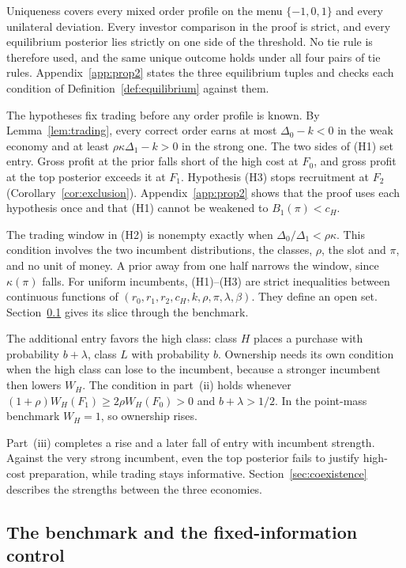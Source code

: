 Uniqueness covers every mixed order profile on the menu \(\{-1,0,1\}\) and every unilateral deviation. Every
investor comparison in the proof is strict, and every equilibrium posterior lies strictly on one side of the
threshold. No tie rule is therefore used, and the same unique outcome holds under all four pairs of tie rules.
Appendix~\ref{app:prop2} states the three equilibrium tuples and checks each condition of
Definition~\ref{def:equilibrium} against them.

The hypotheses fix trading before any order profile is known. By Lemma~\ref{lem:trading}, every correct order
earns at most \(\Delta_0-k<0\) in the weak economy and at least \(\rho\kappa\Delta_1-k>0\) in the strong one. The two
sides of (H1) set entry. Gross profit at the prior falls short of the high cost at \(F_0\), and gross profit at the
top posterior exceeds it at \(F_1\). Hypothesis (H3) stops recruitment at \(F_2\) (Corollary~\ref{cor:exclusion}).
Appendix~\ref{app:prop2} shows that the proof uses each hypothesis once and that (H1) cannot be weakened to
\(B_1(\pi)<c_H\).

The trading window in (H2) is nonempty exactly when \(\Delta_0/\Delta_1<\rho\kappa\). This condition involves the
two incumbent distributions, the classes, \(\rho\), the slot and \(\pi\), and no unit of money. A prior away from
one half narrows the window, since \(\kappa(\pi)\) falls. For uniform incumbents, (H1)--(H3) are strict
inequalities between continuous functions of \((r_0,r_1,r_2,c_H,k,\rho,\pi,\lambda,\beta)\). They define an open
set. Section~\ref{sec:benchmark} gives its slice through the benchmark.

The additional entry favors the high class: class \(H\) places a purchase with probability \(b+\lambda\), class
\(L\) with probability \(b\). Ownership needs its own condition when the high class can lose to the incumbent,
because a stronger incumbent then lowers \(W_H\). The condition in part~(ii) holds whenever
\((1+\rho)W_H(F_1)\ge2\rho W_H(F_0)>0\) and \(b+\lambda>1/2\). In the point-mass benchmark \(W_H=1\), so ownership
rises.

Part~(iii) completes a rise and a later fall of entry with incumbent strength. Against the very strong incumbent,
even the top posterior fails to justify high-cost preparation, while trading stays informative.
Section~\ref{sec:coexistence} describes the strengths between the three economies.

\subsection{The benchmark and the fixed-information control}\label{sec:benchmark}

